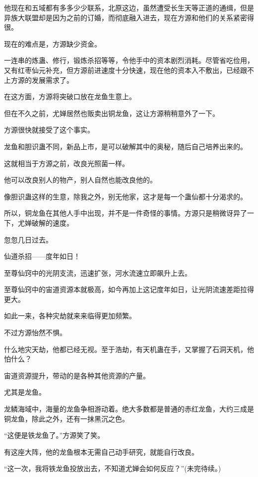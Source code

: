 \begin{this_body}
他现在和五域都有多多少少联系，北原这边，虽然遭受长生天等正道的通缉，但是异族大联盟却是因为之前的订婚，而彻底融入进去，现在方源和他们的关系紧密得很。

现在的难点是，方源缺少资金。

一连串的炼蛊、修行，锻炼杀招等等，令他手中的资本剧烈消耗。尽管省吃俭用，又有红枣仙元补充，但方源前进速度十分快速，现在他的资本入不敷出，已经跟不上方源的发展需求了。

在这方面，方源将突破口放在龙鱼生意上。

但在不久之前，尤婵居然也贩卖出铜龙鱼，这让方源稍稍意外了一下。

方源很快就接受了这个事实。

龙鱼和胆识蛊不同，新品上市，是可以破解其中的奥秘，随后自己培养出来的。

这就相当于方源之前，改良光照菌一样。

他可以改良别人的物产，别人自然也能改良他的。

像胆识蛊这样的生意，除我之外，别无他家，这才是每一个蛊仙都十分渴求的。

所以，铜龙鱼在其他人手中出现，并不是一件奇怪的事情。方源只是稍微讶异了一下，尤婵破解的速度。

忽忽几日过去。

仙道杀招——度年如日！

至尊仙窍中的光阴支流，迅速扩张，河水流速立即飙升上去。

至尊仙窍中的宙道资源本就极高，如今再加上这记度年如日，让光阴流速差距拉得更大。

如此一来，各种灾劫就来来临得更加频繁。

不过方源怡然不惧。

什么地灾天劫，他都已经无视。至于浩劫，有天机蛊在手，又掌握了石洞天机，他怕什么？

宙道资源提升，带动的是各种其他资源的产量。

尤其是龙鱼。

龙鳞海域中，海量的龙鱼争相游动着。绝大多数都是普通的赤红龙鱼，大约三成是铜龙鱼，除此之外，还有一抹黑沉之色。

“这便是铁龙鱼了。”方源笑了笑。

有这座大阵，他的龙鱼根本无需自己动手研究，就能自行改良。

“这一次，我将铁龙鱼投放出去，不知道尤婵会如何反应？”(未完待续。)

\end{this_body}

